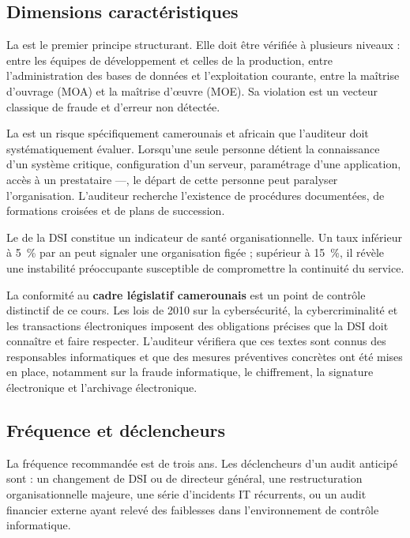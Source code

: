 \subsection{Dimensions caractéristiques}

La  est le premier principe structurant. Elle doit être vérifiée à plusieurs niveaux : entre les équipes de développement et celles de la production, entre l'administration des bases de données et l'exploitation courante, entre la maîtrise d'ouvrage (MOA) et la maîtrise d'œuvre (MOE). Sa violation est un vecteur classique de fraude et d'erreur non détectée.

La  est un risque spécifiquement camerounais et africain que l'auditeur doit systématiquement évaluer. Lorsqu'une seule personne détient la connaissance d'un système critique, configuration d'un serveur, paramétrage d'une application, accès à un prestataire —, le départ de cette personne peut paralyser l'organisation. L'auditeur recherche l'existence de procédures documentées, de formations croisées et de plans de succession.

Le  de la DSI constitue un indicateur de santé organisationnelle. Un taux inférieur à 5~\% par an peut signaler une organisation figée ; supérieur à 15~\%, il révèle une instabilité préoccupante susceptible de compromettre la continuité du service.

La conformité au \textbf{cadre législatif camerounais} est un point de contrôle distinctif de ce cours. Les lois de 2010 sur la cybersécurité, la cybercriminalité et les transactions électroniques imposent des obligations précises que la DSI doit connaître et faire respecter. L'auditeur vérifiera que ces textes sont connus des responsables informatiques et que des mesures préventives concrètes ont été mises en place, notamment sur la fraude informatique, le chiffrement, la signature électronique et l'archivage électronique.

\subsection{Fréquence et déclencheurs}

La fréquence recommandée est de trois ans. Les déclencheurs d'un audit anticipé sont : un changement de DSI ou de directeur général, une restructuration organisationnelle majeure, une série d'incidents IT récurrents, ou un audit financier externe ayant relevé des faiblesses dans l'environnement de contrôle informatique.

